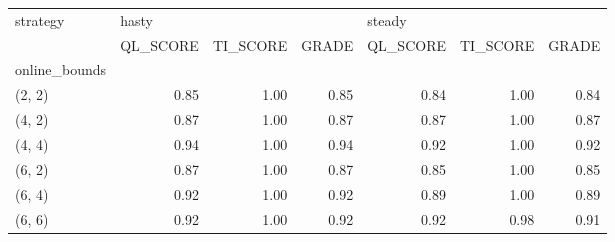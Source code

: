 \begin{tabular}{lrrrrrr}
\toprule
strategy & \multicolumn{3}{l}{hasty} & \multicolumn{3}{l}{steady} \\
{} & QL\_SCORE & TI\_SCORE & GRADE & QL\_SCORE & TI\_SCORE & GRADE \\
online\_bounds &          &          &       &          &          &       \\
\midrule
(2, 2)        &     0.85 &     1.00 &  0.85 &     0.84 &     1.00 &  0.84 \\
(4, 2)        &     0.87 &     1.00 &  0.87 &     0.87 &     1.00 &  0.87 \\
(4, 4)        &     0.94 &     1.00 &  0.94 &     0.92 &     1.00 &  0.92 \\
(6, 2)        &     0.87 &     1.00 &  0.87 &     0.85 &     1.00 &  0.85 \\
(6, 4)        &     0.92 &     1.00 &  0.92 &     0.89 &     1.00 &  0.89 \\
(6, 6)        &     0.92 &     1.00 &  0.92 &     0.92 &     0.98 &  0.91 \\
\bottomrule
\end{tabular}
